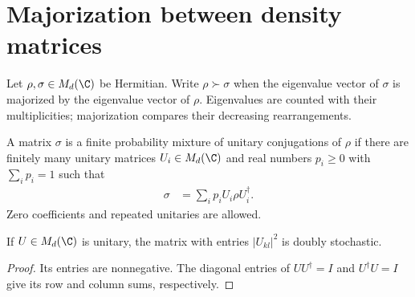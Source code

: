 \section{Majorization between density matrices}

\begin{definition}
    \label{def:density_matrix_majorization}
    \leanok
    Let $\rho,\sigma\in M_d(\C)$ be Hermitian. Write $\rho\succ\sigma$
    when the eigenvalue vector of $\sigma$ is majorized by the eigenvalue
    vector of $\rho$. Eigenvalues are counted with their multiplicities;
    majorization compares their decreasing rearrangements.
\end{definition}

\begin{definition}
    \label{def:density_unitary_mixture}
    \leanok
    A matrix $\sigma$ is a finite probability mixture of unitary
    conjugations of $\rho$ if there are finitely many unitary matrices
    $U_i\in M_d(\C)$ and real numbers $p_i\geq0$ with $\sum_i p_i=1$ such that
    \begin{align}
        \sigma&=\sum_i p_i U_i\rho U_i^\dagger.
        \label{eq:density_unitary_mixture}
    \end{align}
    Zero coefficients and repeated unitaries are allowed.
\end{definition}

\begin{lemma}
    \label{lem:density_unitary_stochastic}
    \leanok
    If $U\in M_d(\C)$ is unitary, the matrix with entries $|U_{kl}|^2$
    is doubly stochastic.
\end{lemma}
\begin{proof}\leanok
    Its entries are nonnegative. The diagonal entries of $UU^\dagger=I$
    and $U^\dagger U=I$ give its row and column sums, respectively.
\end{proof}

